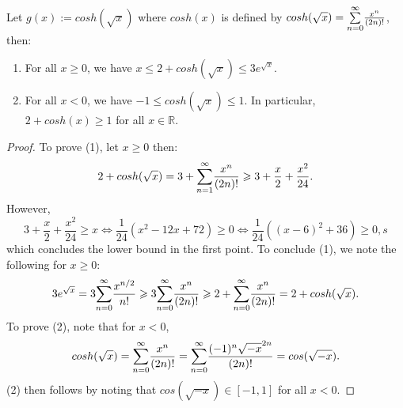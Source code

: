 \begin{remark}
  Let $g(x):= cosh(\sqrt{x})$ where $cosh(x)$ is defined by $cosh(\sqrt{x})=\overunderset{\infty}{n=0}{\sum}\frac{x^n}{(2n)!}$, then: 
  \begin{enumerate}
    \item For all $x\geq 0$, we have $x \leq 2+cosh(\sqrt{x}) \leq 3e^{\sqrt{x}}$.
    \item For all $x <0$, we have $-1 \leq cosh(\sqrt{x})\leq 1$. In particular, $2+cosh(x)\geq 1$ for all $x\in \mathbb{R}$.
  \end{enumerate}
\end{remark}
%
\begin{proof}
  To prove (1), let $x\geq 0$ then:
  \begin{equation*}
    2+cosh(\sqrt{x}) = 3 + \overunderset{\infty}{n=1}{\sum}\frac{x^n}{(2n)!}\geq 3 + \frac{x}{2}+\frac{x^2}{24}.
  \end{equation*}
  However,
  \begin{equation*}
    3+\frac{x}{2}+\frac{x^2}{24}\geq x \iff \frac{1}{24}(x^2-12x+72)\geq 0 \iff \frac{1}{24}((x-6)^2+36)\geq 0,s
  \end{equation*}
  which concludes the lower bound in the first point. To conclude (1), we note the following for $x\geq0$: 
  \begin{equation*}
    3e^{\sqrt{x}}= 3\overunderset{\infty}{n=0}{\sum}\frac{x^{n/2}}{n!}\geq 3\overunderset{\infty}{n=0}{\sum}\frac{x^{n}}{(2n)!} \geq 2 + \overunderset{\infty}{n=0}{\sum}\frac{x^{n}}{(2n)!}= 2 + cosh(\sqrt{x}).
  \end{equation*}
  To prove (2), note that for $x<0$,
  \begin{equation*}
    cosh(\sqrt{x})= \overunderset{\infty}{n=0}{\sum}\frac{x^n}{(2n)!}= \overunderset{\infty}{n=0}{\sum}\frac{(-1)^n \sqrt{-x}^{2n}}{(2n)!}= cos(\sqrt{-x}).
  \end{equation*}
  (2) then follows by noting that $cos(\sqrt{-x}) \in [-1,1]$ for all $x<0$. 
\end{proof}


